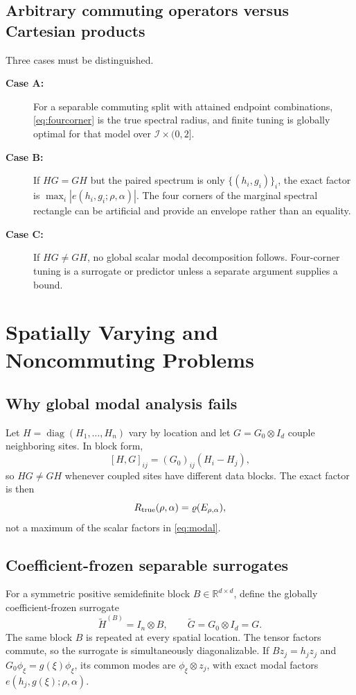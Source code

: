 \documentclass[pdflatex,iicol,sn-mathphys-num]{sn-jnl}
\theoremstyle{definition}
\newcommand{\R}{\mathbb{R}}
\newcommand{\spr}{\varrho}
\newcommand{\diag}{\operatorname{diag}}
\begin{document}
\subsection{Arbitrary commuting operators versus Cartesian products}
Three cases must be distinguished.
\begin{description}
\item[\textbf{Case A:}] For a separable commuting split with attained endpoint combinations,
\eqref{eq:fourcorner} is the true spectral radius, and finite tuning is globally
optimal for that model over $\mathcal I\times(0,2]$.
\item[\textbf{Case B:}] If $HG=GH$ but the paired spectrum is only
$\{(h_i,g_i)\}_i$, the exact factor is
$\max_i|e(h_i,g_i;\rho,\alpha)|$. The four corners of the marginal spectral
rectangle can be artificial and provide an envelope rather than an equality.
\item[\textbf{Case C:}] If $HG\ne GH$, no global scalar modal decomposition follows. Four-corner
tuning is a surrogate or predictor unless a separate argument supplies a
bound.
\end{description}

\section{Spatially Varying and Noncommuting Problems}\label{sec:noncommuting}
\subsection{Why global modal analysis fails}
Let $H=\diag(H_1,\ldots,H_n)$ vary by location and let
$G=G_0\otimes I_d$ couple neighboring sites. In block form,
\[
[H,G]_{ij}=(G_0)_{ij}(H_i-H_j),
\]
so $HG\ne GH$ whenever coupled sites have different data blocks. The exact
factor is then
\[
R_{\rm true}(\rho,\alpha)=\spr(E_{\rho,\alpha}),
\]
not a maximum of the scalar factors in \eqref{eq:modal}.

\subsection{Coefficient-frozen separable surrogates}
For a symmetric positive semidefinite block $B\in\R^{d\times d}$, define the
globally coefficient-frozen surrogate
\[
\widetilde H^{(B)}=I_n\otimes B,\qquad
\widetilde G=G_0\otimes I_d=G.
\]
The same block $B$ is repeated at every spatial location. The tensor factors
commute, so the surrogate is simultaneously diagonalizable. If $Bz_j=h_jz_j$
and $G_0\phi_\xi=g(\xi)\phi_\xi$, its common modes are
$\phi_\xi\otimes z_j$, with exact modal factors
$e(h_j,g(\xi);\rho,\alpha)$.
\end{document}
